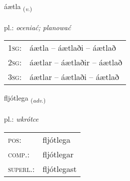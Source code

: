 \documentclass[frontgrid, backgrid]{flacards}\usepackage[]{graphicx}\usepackage[]{xcolor}
\begin{document}
\renewcommand{\flhead}{\vskip5pt \fboxsep=0pt {\small\bfseries\footnotesize Sagnorð | Verb}}
\renewcommand{\fcfoot}{\vskip5pt \fboxsep=0pt \hspace{2pt}{\small\bfseries\footnotesize 2K}}

\renewcommand{\blhead}{\vskip5pt {\small\bfseries\footnotesize Sagnorð | Verb }}
\renewcommand{\bcfoot}{\vskip5pt \hspace{2pt}{\small\bfseries\footnotesize 2K}}


{áætla \small{\textsubscript{(\textit{v.})}} \\[1ex] %
\textphonetic{[auːaihtla]} \\
pl.: \emph{oceniać; planować} \\  [2ex]
\renewcommand*{\arraystretch}{0.8}
\begin{tabular}{p{1cm}l}
\textsc{1sg}: & áætla -- áætlaði -- áætlað \\ 
\textsc{2sg}: & áætlar -- áætlaðir -- áætlað \\ 
\textsc{3sg}: & áætlar -- áætlaði -- áætlað \\ 
\end{tabular}
}

\renewcommand{\flhead}{\vskip5pt \fboxsep=0pt {\small\bfseries\footnotesize Atviksorð | Adverb}}
\renewcommand{\fcfoot}{\vskip5pt \fboxsep=0pt \hspace{2pt}{\small\bfseries\footnotesize 2K}}

\renewcommand{\blhead}{\vskip5pt {\small\bfseries\footnotesize Atviksorð | Adverb }}
\renewcommand{\bcfoot}{\vskip5pt \hspace{2pt}{\small\bfseries\footnotesize 2K}}


{fljótlega \small{\textsubscript{(\textit{adv.})}} \\[1ex] %
\textphonetic{[fljoutlɛɣa]} \\
pl.: \emph{wkrótce} \\  [2ex]
\renewcommand*{\arraystretch}{0.8}
\begin{tabular}{ll}
\textsc{pos}: & fljótlega \\ 
\textsc{comp.}: & fljótlegar \\ 
\textsc{superl.}: & fljótlegast \\
\end{tabular}
}
\end{document}
